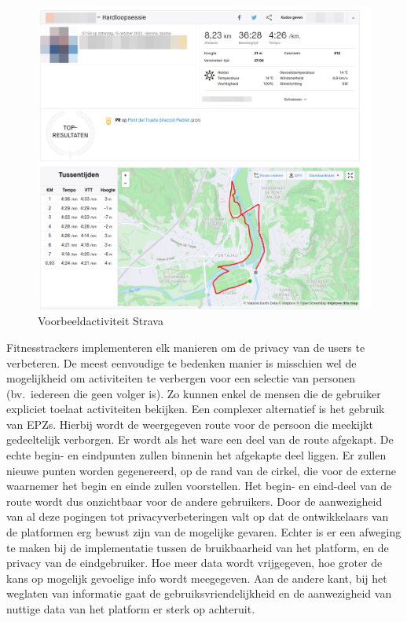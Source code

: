 \begin{figure}
    \centering
    \includegraphics[width=0.5\linewidth]{fig/VoorbeeldActiviteiten/VoorbeeldActiviteit_Cropped.png}
    \caption{Voorbeeldactiviteit Strava}\label{fig:activityExample}
\end{figure}

Fitnesstrackers implementeren elk manieren om de privacy van de users te
verbeteren. De meest eenvoudige te bedenken manier is misschien wel de
mogelijkheid om activiteiten te verbergen voor een selectie van personen (bv.\
iedereen die geen volger is). Zo kunnen enkel de mensen die de gebruiker
expliciet toelaat activiteiten bekijken. Een complexer alternatief is het
gebruik van \acp{EPZ}. Hierbij wordt de weergegeven route voor de persoon die
meekijkt gedeeltelijk verborgen. Er wordt als het ware een deel van de route
afgekapt. De echte begin- en eindpunten zullen binnenin het afgekapte deel
liggen. Er zullen nieuwe punten worden gegenereerd, op de rand van de cirkel,
die voor de externe waarnemer het begin en einde zullen voorstellen. Het begin-
en eind-deel van de route wordt dus onzichtbaar voor de andere gebruikers. Door
de aanwezigheid van al deze pogingen tot privacyverbeteringen valt op dat de
ontwikkelaars van de platformen erg bewust zijn van de mogelijke gevaren.
Echter is er een afweging te maken bij de implementatie tussen de bruikbaarheid
van het platform, en de privacy van de eindgebruiker. Hoe meer data wordt
vrijgegeven, hoe groter de kans op mogelijk gevoelige info wordt meegegeven.
Aan de andere kant, bij het weglaten van informatie gaat de
gebruiksvriendelijkheid en de aanwezigheid van nuttige data van het platform er
sterk op achteruit.

